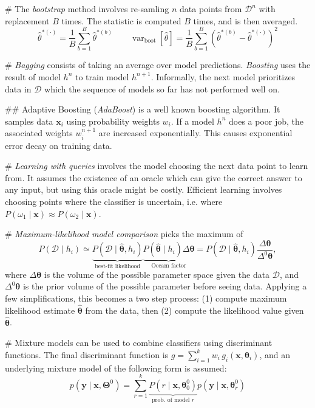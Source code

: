 \documentclass[12pt, a4paper]{article}
\newcommand{\D}{\mathcal{D}}
\newcommand{\vect}[1]{\bm{#1}}
\DeclareMathOperator{\var}{\operatorname{var}}
\begin{document}
\begin{easylist}[itemize]
# The \emph{bootstrap} method involves re-samling $n$ data points from $\D^n$ with replacement $B$ times.
The statistic is computed $B$ times, and is then averaged.
\begin{equation*}
	\hat{\theta}^{*(\cdot)} = \frac{1}{B} \sum_{b=1}^{B} \hat{\theta}^{*(b)}
	\qquad 
	\var_{\text{boot}} [ \hat{\theta} ]
	=
	\frac{1}{B} \sum_{b=1}^{B}
	\left( \hat{\theta}^{*(b)} - \hat{\theta}^{*(\cdot)} \right)^2 
\end{equation*}


# \emph{Bagging} consists of taking an average over model predictions.
\emph{Boosting} uses the result of model $h^{n}$ to train model $h^{n+1}$.
Informally, the next model prioritizes data in $\D$ which the sequence of models so far has not performed well on.

## Adaptive Boosting (\emph{AdaBoost}) is a well known boosting algorithm.
It samples data $\vect{x}_i$ using probability weights $w_i$.
If a model $h^n$ does a poor job, the associated weights $w_i^{n+1}$ are increased exponentially. 
This causes exponential error decay on training data.

# \emph{Learning with queries} involves the model choosing the next data point to learn from.
It assumes the existence of an oracle which can give the correct answer to any input, but using this oracle might be costly.
Efficient learning involves choosing points where the classifier is uncertain, i.e. where $P(\omega_1 \mid \vect{x}) \approx P(\omega_2 \mid \vect{x})$.

# \emph{Maximum-likelihood model comparison} picks the maximum of
\begin{equation*}
	P(\D \mid h_i ) \simeq 
	\underbrace{P(\D \mid \hat{\vect{\theta}}, h_i)}_{\text{best-fit likelihood}}
	\underbrace{P(\hat{\vect{\theta}} \mid h_i) \Delta \vect{\theta}}_{\text{Occam factor}}
	= 
	P(\D \mid \hat{\vect{\theta}}, h_i)
	\frac{\Delta \vect{\theta}}{\Delta^0 \vect{\theta}},
\end{equation*}
where $\Delta \vect{\theta}$ is the volume of the possible parameter space given the data $\D$, and $\Delta^0 \vect{\theta}$ is the prior volume of the possible parameter before seeing data.
Applying a few simplifications, this becomes a two step process: (1) compute maximum likelihood estimate $\hat{\vect{\theta}}$ from the data, then (2) compute the likelihood value given $\hat{\vect{\theta}}$.

# Mixture models can be used to combine classifiers using discriminant functions.
The final discriminant function is $g = \sum_{i=1}^{k} w_i \, g_i(\vect{x}, \vect{\theta}_i)$, and an underlying mixture model of the following form is assumed:
\begin{equation*}
	p(\vect{y} \mid \vect{x}, \vect{\Theta}^0)
	= \sum_{r=1}^{k}
	\underbrace{P(r \mid \vect{x}, \vect{\theta}_0^0 )}_{\text{prob. of model }r}
	p(\vect{y} \mid \vect{x}, \vect{\theta}_r^0 )
\end{equation*}
\end{easylist}
\end{document}
